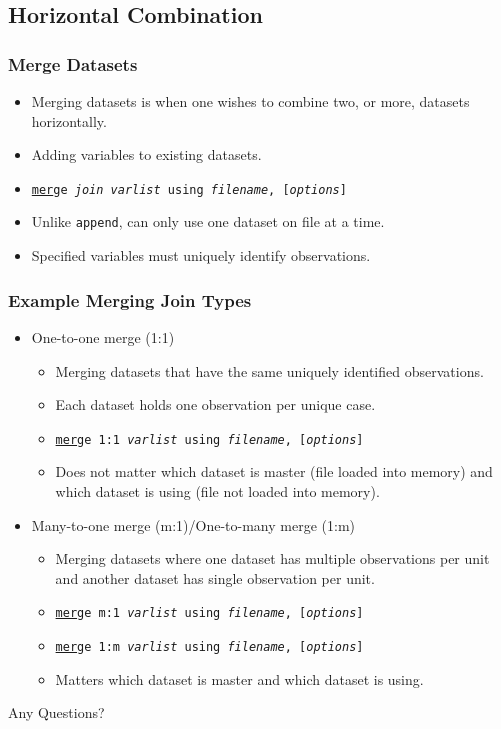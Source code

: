\documentclass{beamer}
\begin{document}
\subsection{Horizontal Combination}

\begin{frame}
	\frametitle{Merge Datasets}
		\begin{itemize}
			\item Merging datasets is when one wishes to combine two, or more, datasets horizontally.
			\item Adding variables to existing datasets.
			\item \texttt{\underline{mer}ge \emph{join} \textit{varlist} using \textit{filename}, [\textit{options}]}
			\item Unlike \texttt{append}, can only use one dataset on file at a time.
			\item Specified variables must uniquely identify observations.
		\end{itemize}
\end{frame}

\begin{frame}
	\frametitle{Example Merging Join Types}
		\begin{itemize}
			\item One-to-one merge (1:1)
				\begin{itemize}
					\item Merging datasets that have the same uniquely identified observations.
					\item Each dataset holds one observation per unique case.
					\item \texttt{\underline{mer}ge 1:1 \textit{varlist} using \textit{filename}, [\textit{options}]}
					\item Does not matter which dataset is master (file loaded into memory) and which dataset is using (file not loaded into memory).
				\end{itemize}
			\item Many-to-one merge (m:1)/One-to-many merge (1:m)
				\begin{itemize}
					\item Merging datasets where one dataset has multiple observations per unit and another dataset has single observation per unit.
					\item \texttt{\underline{mer}ge m:1 \textit{varlist} using \textit{filename}, [\textit{options}]}
					\item \texttt{\underline{mer}ge 1:m \textit{varlist} using \textit{filename}, [\textit{options}]}
					\item Matters which dataset is master and which dataset is using.
				\end{itemize}
		\end{itemize}
\end{frame}

\begin{frame}
	\begin{center}
		\begin{LARGE}
			Any Questions?
		\end{LARGE}
	\end{center}
\end{frame}
\end{document}
